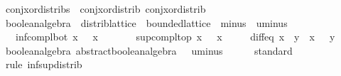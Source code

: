 \begin{isabellebody}
%
\isadelimproof
\isanewline
%
\endisadelimproof
\isanewline
{}\isamarkupfalse%
\ conj{\isacharunderscore}{\kern0pt}xor{\isacharunderscore}{\kern0pt}distribs\ {\isacharequal}{\kern0pt}\ conj{\isacharunderscore}{\kern0pt}xor{\isacharunderscore}{\kern0pt}distrib\ conj{\isacharunderscore}{\kern0pt}xor{\isacharunderscore}{\kern0pt}distrib{}\isanewline
\isanewline
{}\isamarkupfalse%
%
\isadelimdocument
%
\endisadelimdocument
%
\isatagdocument
%
\isamarkuptrue%
%
\endisatagdocument
{\isafolddocument}%
%
\isadelimdocument
%
\endisadelimdocument
{}\isamarkupfalse%
\ boolean{\isacharunderscore}{\kern0pt}algebra\ {\isacharequal}{\kern0pt}\ distrib{\isacharunderscore}{\kern0pt}lattice\ {\isacharplus}{\kern0pt}\ bounded{\isacharunderscore}{\kern0pt}lattice\ {\isacharplus}{\kern0pt}\ minus\ {\isacharplus}{\kern0pt}\ uminus\ {\isacharplus}{\kern0pt}\isanewline
\ \ \ inf{\isacharunderscore}{\kern0pt}compl{\isacharunderscore}{\kern0pt}bot{\isacharcolon}{\kern0pt}\ {\isacartoucheopen}x\ {\isasymsqinter}\ {\isacharminus}{\kern0pt}\ x\ {\isacharequal}{\kern0pt}\ {\isasymbottom}{\isacartoucheclose}\isanewline
\ \ \ \ \ sup{\isacharunderscore}{\kern0pt}compl{\isacharunderscore}{\kern0pt}top{\isacharcolon}{\kern0pt}\ {\isacartoucheopen}x\ {\isasymsqunion}\ {\isacharminus}{\kern0pt}\ x\ {\isacharequal}{\kern0pt}\ {\isasymtop}{\isacartoucheclose}\isanewline
\ \ \ diff{\isacharunderscore}{\kern0pt}eq{\isacharcolon}{\kern0pt}\ {\isacartoucheopen}x\ {\isacharminus}{\kern0pt}\ y\ {\isacharequal}{\kern0pt}\ x\ {\isasymsqinter}\ {\isacharminus}{\kern0pt}\ y{\isacartoucheclose}\isanewline
{}\isanewline
\isanewline
{}\isamarkupfalse%
\ boolean{\isacharunderscore}{\kern0pt}algebra{\isacharcolon}{\kern0pt}\ abstract{\isacharunderscore}{\kern0pt}boolean{\isacharunderscore}{\kern0pt}algebra\ {\isacartoucheopen}{\isacharparenleft}{\kern0pt}{\isasymsqinter}{\isacharparenright}{\kern0pt}{\isacartoucheclose}\ {\isacartoucheopen}{\isacharparenleft}{\kern0pt}{\isasymsqunion}{\isacharparenright}{\kern0pt}{\isacartoucheclose}\ uminus\ {\isasymbottom}\ {\isasymtop}\isanewline
%
\isadelimproof
\ \ %
\endisadelimproof
%
\isatagproof
{}\isamarkupfalse%
\ standard\isanewline
\ \ \ \ \ \ \ \isamarkupfalse%
\ {\isacharparenleft}{\kern0pt}rule\ inf{\isacharunderscore}{\kern0pt}sup{\isacharunderscore}{\kern0pt}distrib{}{\isacharparenright}{\kern0pt}\isanewline
\ \ \ \ \ \ \isamarkupfalse%

\end{isabellebody}
